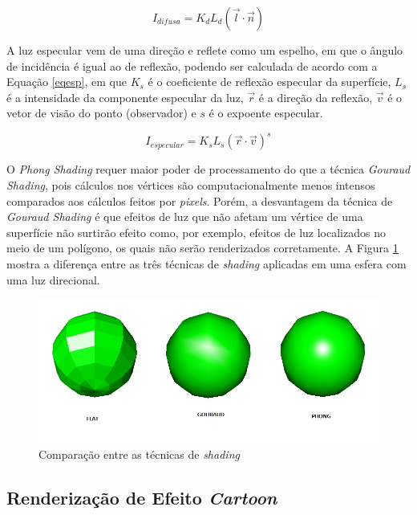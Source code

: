 {	\begin{equation}
		I_ {difusa} = K_ {d}L_ {d}( \overrightarrow{ l} \cdot \overrightarrow{ n}) 
	\label{eqdif}
	\end{equation}

	 A luz especular vem de uma direção e reflete como um espelho, em que o ângulo de incidência é igual ao de reflexão, podendo ser calculada de acordo com a Equação \ref{eqesp}, em que $K_ {s}$ é o coeficiente de reflexão especular da superfície, $L_ {s}$ é a intensidade da componente especular da luz, $\overrightarrow{ r}$ é a direção da reflexão, $\overrightarrow{v}$ é o vetor de visão do ponto (observador) e $s$ é o expoente especular.

	\begin{equation}
		I_ {especular} =K_ {s}L_ {s} (\overrightarrow{ r} \cdot \overrightarrow{ v})^s
	\label{eqesp}
	\end{equation}

	 O \textit{Phong Shading} requer maior poder de processamento do que a técnica \textit{Gouraud Shading}, pois cálculos nos vértices são computacionalmente menos intensos comparados aos cálculos feitos por \textit{pixels}. Porém, a desvantagem da técnica de \textit{Gouraud Shading} é que efeitos de luz que não afetam um vértice de uma superfície não surtirão efeito como, por exemplo, efeitos de luz localizados no meio de um polígono, os quais não serão renderizados corretamente. A Figura \ref{fgp} mostra a diferença entre as três técnicas de \textit{shading} aplicadas em uma esfera com uma luz direcional. 

	\begin{figure}[ht]
	\centering
		\includegraphics[keepaspectratio=true,scale=0.5]{figuras/flatgp.jpg}
	\caption{Comparação entre as técnicas de \textit{shading}}
	\label{fgp}
	\end{figure}

	\subsection{Renderização de Efeito \textit{Cartoon}}
	\label{cartoon}

}
